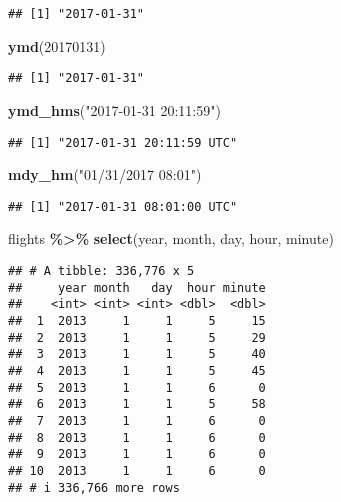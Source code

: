 \documentclass[
]{article}
\newenvironment{Shaded}{\begin{snugshade}}{\end{snugshade}}
\newcommand{\DecValTok}[1]{\textcolor[rgb]{0.00,0.00,0.81}{#1}}
\newcommand{\FunctionTok}[1]{\textcolor[rgb]{0.13,0.29,0.53}{\textbf{#1}}}
\newcommand{\NormalTok}[1]{#1}
\newcommand{\SpecialCharTok}[1]{\textcolor[rgb]{0.81,0.36,0.00}{\textbf{#1}}}
\newcommand{\StringTok}[1]{\textcolor[rgb]{0.31,0.60,0.02}{#1}}
\begin{document}
\begin{verbatim}
## [1] "2017-01-31"
\end{verbatim}

\begin{Shaded}
\begin{Highlighting}[]
\FunctionTok{ymd}\NormalTok{(}\DecValTok{20170131}\NormalTok{)}
\end{Highlighting}
\end{Shaded}

\begin{verbatim}
## [1] "2017-01-31"
\end{verbatim}

\begin{Shaded}
\begin{Highlighting}[]
\FunctionTok{ymd\_hms}\NormalTok{(}\StringTok{"2017{-}01{-}31 20:11:59"}\NormalTok{)}
\end{Highlighting}
\end{Shaded}

\begin{verbatim}
## [1] "2017-01-31 20:11:59 UTC"
\end{verbatim}

\begin{Shaded}
\begin{Highlighting}[]
\FunctionTok{mdy\_hm}\NormalTok{(}\StringTok{"01/31/2017 08:01"}\NormalTok{)}
\end{Highlighting}
\end{Shaded}

\begin{verbatim}
## [1] "2017-01-31 08:01:00 UTC"
\end{verbatim}

\begin{Shaded}
\begin{Highlighting}[]
\NormalTok{flights }\SpecialCharTok{\%\textgreater{}\%} 
  \FunctionTok{select}\NormalTok{(year, month, day, hour, minute)}
\end{Highlighting}
\end{Shaded}

\begin{verbatim}
## # A tibble: 336,776 x 5
##     year month   day  hour minute
##    <int> <int> <int> <dbl>  <dbl>
##  1  2013     1     1     5     15
##  2  2013     1     1     5     29
##  3  2013     1     1     5     40
##  4  2013     1     1     5     45
##  5  2013     1     1     6      0
##  6  2013     1     1     5     58
##  7  2013     1     1     6      0
##  8  2013     1     1     6      0
##  9  2013     1     1     6      0
## 10  2013     1     1     6      0
## # i 336,766 more rows
\end{verbatim}
\end{document}
